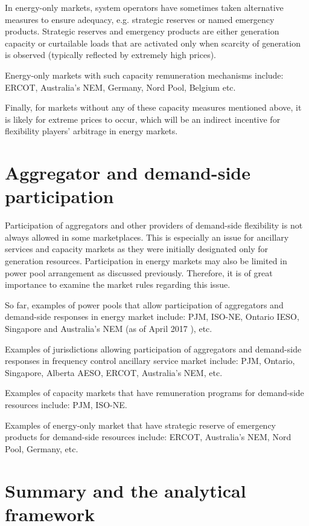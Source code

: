 In energy-only markets, system operators have sometimes taken alternative measures to ensure adequacy, e.g. strategic reserves or named emergency products. Strategic reserves and emergency products are either generation capacity or curtailable loads that are activated only when scarcity of generation is observed (typically reflected by extremely high prices).

Energy-only markets with such capacity remuneration mechanisms include: ERCOT, Australia's NEM, Germany, Nord Pool, Belgium etc. 

Finally, for markets without any of these capacity measures mentioned above, it is likely for extreme prices to occur, which will be an indirect incentive for flexibility players' arbitrage in energy markets.

\section{Aggregator and demand-side participation}

Participation of aggregators and other providers of demand-side flexibility is not always allowed in some marketplaces. This is especially an issue for ancillary services and capacity markets as they were initially designated only for generation resources. Participation in energy markets may also be limited in power pool arrangement as discussed previously. Therefore, it is of great importance to examine the market rules regarding this issue.

So far, examples of power pools that allow participation of aggregators and demand-side responses in energy market include: PJM, ISO-NE, Ontario IESO, Singapore and Australia's NEM (as of April 2017 \cite{AEMO_DR}), etc.

Examples of jurisdictions allowing participation of aggregators and demand-side responses in frequency control ancillary service market include: PJM, Ontario, Singapore, Alberta AESO, ERCOT, Australia's NEM, etc.

Examples of capacity markets that have remuneration programs for demand-side resources include: PJM, ISO-NE.

Examples of energy-only market that have strategic reserve of emergency products for demand-side resources include: ERCOT, Australia's NEM, Nord Pool, Germany, etc.

\section{Summary and the analytical framework}

